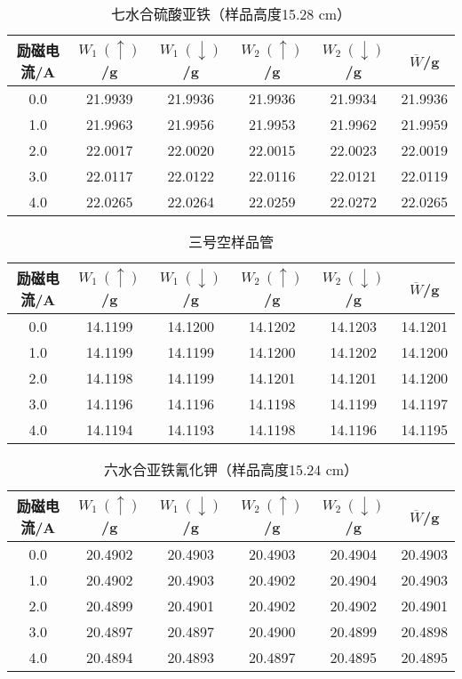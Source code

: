 \documentclass[12pt]{ctexart}
\numberwithin{equation}{section}
\begin{document}
\vspace{3cm}
\begin{longtable}{cccccc}
    \caption{七水合硫酸亚铁（样品高度15.28 cm）} \\
    \hline
    励磁电流/A & $W_1~(\uparrow)$/g & $W_1~(\downarrow)$/g &
    $W_2~(\uparrow)$/g & $W_2~(\downarrow)$/g &
    $\overline{W}$/g \\
    \hline
    0.0 & 21.9939 & 21.9936 & 21.9936 & 21.9934 & 21.9936 \\
    1.0 & 21.9963 & 21.9956 & 21.9953 & 21.9962 & 21.9959 \\
    2.0 & 22.0017 & 22.0020 & 22.0015 & 22.0023 & 22.0019 \\
    3.0 & 22.0117 & 22.0122 & 22.0116 & 22.0121 & 22.0119 \\
    4.0 & 22.0265 & 22.0264 & 22.0259 & 22.0272 & 22.0265 \\
    \hline
\end{longtable}

\begin{longtable}{cccccc}
    \caption{三号空样品管} \\
    \hline
    励磁电流/A & $W_1~(\uparrow)$/g & $W_1~(\downarrow)$/g &
    $W_2~(\uparrow)$/g & $W_2~(\downarrow)$/g &
    $\overline{W}$/g \\
    \hline
    0.0 & 14.1199 & 14.1200 & 14.1202 & 14.1203 & 14.1201 \\
    1.0 & 14.1199 & 14.1199 & 14.1200 & 14.1202 & 14.1200 \\
    2.0 & 14.1198 & 14.1199 & 14.1201 & 14.1201 & 14.1200 \\
    3.0 & 14.1196 & 14.1196 & 14.1198 & 14.1199 & 14.1197 \\
    4.0 & 14.1194 & 14.1193 & 14.1198 & 14.1196 & 14.1195 \\
    \hline
\end{longtable}

\begin{longtable}{cccccc}
    \caption{六水合亚铁氰化钾（样品高度15.24 cm）} \\
    \hline
    励磁电流/A & $W_1~(\uparrow)$/g & $W_1~(\downarrow)$/g &
    $W_2~(\uparrow)$/g & $W_2~(\downarrow)$/g &
    $\overline{W}$/g \\
    \hline
    0.0 & 20.4902 & 20.4903 & 20.4903 & 20.4904 & 20.4903 \\
    1.0 & 20.4902 & 20.4903 & 20.4902 & 20.4904 & 20.4903 \\
    2.0 & 20.4899 & 20.4901 & 20.4902 & 20.4902 & 20.4901 \\
    3.0 & 20.4897 & 20.4897 & 20.4900 & 20.4899 & 20.4898 \\
    4.0 & 20.4894 & 20.4893 & 20.4897 & 20.4895 & 20.4895 \\
    \hline
\end{longtable}
\end{document}
